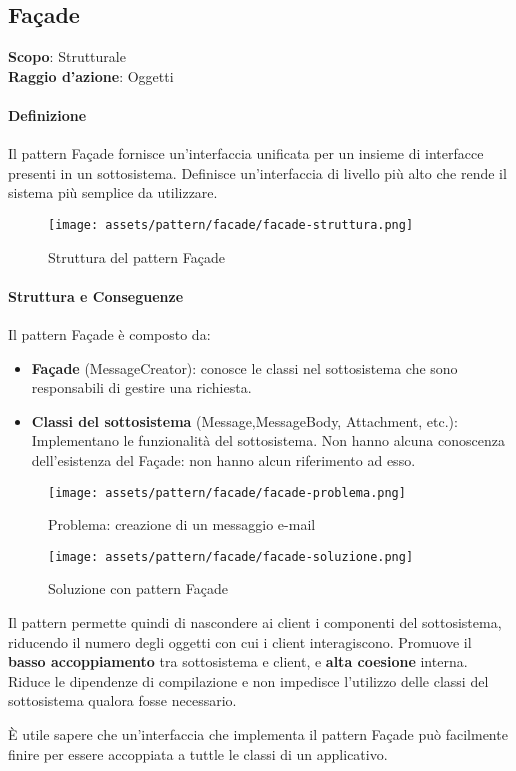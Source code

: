 \subsection{Façade}
\label{facade}

\textbf{Scopo}: Strutturale \\
\textbf{Raggio d'azione}: Oggetti

\paragraph{Definizione} Il pattern Façade fornisce un'interfaccia unificata per un insieme di interfacce presenti in un sottosistema. Definisce un'interfaccia di livello più alto che rende il sistema più semplice da utilizzare.

\begin{figure}[H]
    \centering
    \texttt{[image: assets/pattern/facade/facade-struttura.png]}
    \caption{Struttura del pattern Façade}
\end{figure}

\paragraph{Struttura e Conseguenze} Il pattern Façade è composto da:
\begin{itemize}
    \item \textbf{Façade} (MessageCreator): conosce le classi nel sottosistema che sono responsabili di gestire una richiesta. 
    \item \textbf{Classi del sottosistema} (Message,MessageBody, Attachment, etc.): Implementano le funzionalità del sottosistema. Non hanno alcuna conoscenza dell’esistenza del Façade: non hanno alcun riferimento ad esso.
\end{itemize}

\begin{figure}[H]
    \centering
    \texttt{[image: assets/pattern/facade/facade-problema.png]}
    \caption{Problema: creazione di un messaggio e-mail}
\end{figure}

\begin{figure}[H]
    \centering
    \texttt{[image: assets/pattern/facade/facade-soluzione.png]}
    \caption{Soluzione con pattern Façade}
\end{figure}

Il pattern permette quindi di nascondere ai client i componenti del sottosistema, riducendo il numero degli oggetti con cui i client interagiscono. Promuove il \textbf{basso accoppiamento} tra sottosistema e client, e \textbf{alta coesione} interna. Riduce le dipendenze di compilazione e non impedisce l'utilizzo delle classi del sottosistema qualora fosse necessario.

È utile sapere che un'interfaccia che implementa il pattern Façade può facilmente finire per essere accoppiata a tuttle le classi di un applicativo.

\newpage